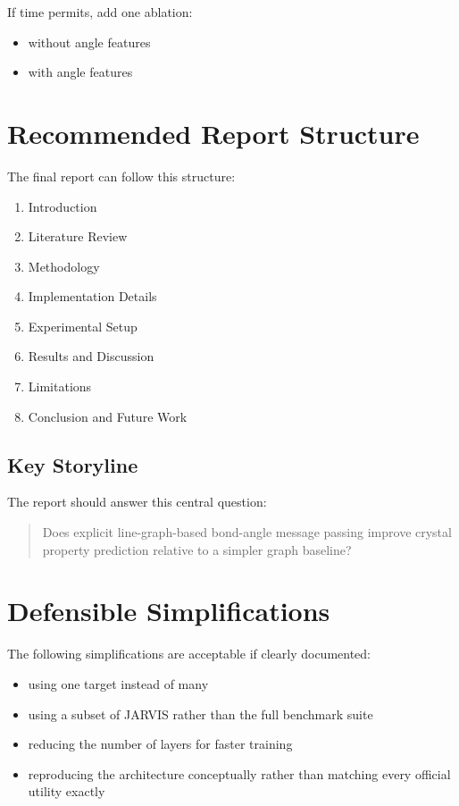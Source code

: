 \documentclass[12pt]{article}
\begin{document}
If time permits, add one ablation:
\begin{itemize}
    \item without angle features
    \item with angle features
\end{itemize}

\section{Recommended Report Structure}
The final report can follow this structure:

\begin{enumerate}
    \item Introduction
    \item Literature Review
    \item Methodology
    \item Implementation Details
    \item Experimental Setup
    \item Results and Discussion
    \item Limitations
    \item Conclusion and Future Work
\end{enumerate}

\subsection{Key Storyline}
The report should answer this central question:
\begin{quote}
Does explicit line-graph-based bond-angle message passing improve crystal property prediction relative to a simpler graph baseline?
\end{quote}

\section{Defensible Simplifications}
The following simplifications are acceptable if clearly documented:

\begin{itemize}
    \item using one target instead of many
    \item using a subset of JARVIS rather than the full benchmark suite
    \item reducing the number of layers for faster training
    \item reproducing the architecture conceptually rather than matching every official utility exactly
\end{itemize}
\end{document}
